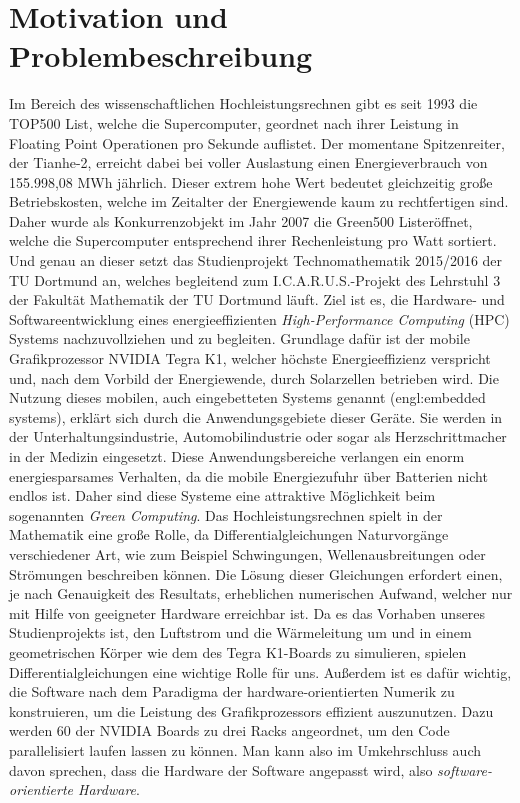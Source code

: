 \section{Motivation und Problembeschreibung}
Im Bereich des wissenschaftlichen Hochleistungsrechnen gibt es seit 1993 die
\glqq TOP500 List\grqq, welche die Supercomputer, geordnet nach ihrer Leistung 
in Floating Point Operationen pro Sekunde auflistet. Der momentane Spitzenreiter, 
der Tianhe-2, erreicht dabei bei voller Auslastung einen Energieverbrauch von 155.998,08 MWh 
jährlich. Dieser extrem hohe Wert bedeutet gleichzeitig große Betriebskosten,
 welche im Zeitalter der Energiewende kaum zu rechtfertigen sind. Daher wurde 
als Konkurrenzobjekt im Jahr 2007 die \glqq Green500 List\grqq eröffnet, welche 
die Supercomputer entsprechend ihrer Rechenleistung pro Watt sortiert. Und genau 
an dieser setzt das Studienprojekt Technomathematik 2015/2016 der TU Dortmund an, 
welches begleitend zum I.C.A.R.U.S.-Projekt des Lehrstuhl 3 der Fakultät Mathematik der TU Dortmund läuft. 
Ziel ist es, die Hardware- und Softwareentwicklung eines energieeffizienten 
\textit{High-Performance Computing} (HPC) Systems nachzuvollziehen und zu begleiten. 
Grundlage dafür ist der mobile Grafikprozessor NVIDIA Tegra K1, 
welcher höchste Energieeffizienz verspricht und, nach dem Vorbild der Energiewende, 
durch Solarzellen betrieben wird. Die Nutzung dieses mobilen, 
auch eingebetteten Systems genannt (engl:\glqq embedded systems\grqq), 
erklärt sich durch die Anwendungsgebiete dieser Geräte. 
Sie werden in der Unterhaltungsindustrie, Automobilindustrie oder sogar als Herzschrittmacher in der Medizin eingesetzt. 
Diese Anwendungsbereiche verlangen ein enorm energiesparsames Verhalten, da die mobile Energiezufuhr über Batterien nicht endlos ist.
Daher sind diese Systeme eine attraktive Möglichkeit beim sogenannten \textit{Green Computing}. 
Das Hochleistungsrechnen spielt in der Mathematik eine große Rolle,
 da Differentialgleichungen Naturvorgänge verschiedener Art, wie zum Beispiel Schwingungen,
 Wellenausbreitungen oder Strömungen beschreiben können. Die Lösung dieser Gleichungen erfordert einen,
 je nach Genauigkeit des Resultats, erheblichen numerischen Aufwand,
 welcher nur mit Hilfe von geeigneter Hardware erreichbar ist. Da es das Vorhaben unseres Studienprojekts ist,
 den Luftstrom und die Wärmeleitung um und in einem geometrischen Körper wie dem des Tegra K1-Boards zu simulieren,
 spielen Differentialgleichungen eine wichtige Rolle für uns. Außerdem ist es dafür wichtig,
 die Software nach dem Paradigma der hardware-orientierten Numerik zu konstruieren,
 um die Leistung des Grafikprozessors effizient auszunutzen. Dazu werden 60 der NVIDIA Boards zu drei Racks angeordnet,
 um den Code parallelisiert laufen lassen zu können. Man kann also im Umkehrschluss auch davon sprechen,
 dass die Hardware der Software angepasst wird, also \textit{software-orientierte Hardware}. 

